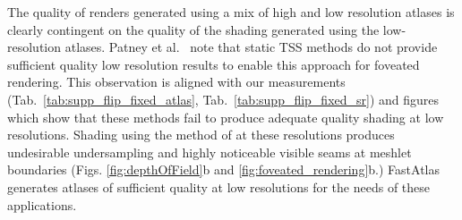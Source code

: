 The quality of renders generated using a mix of high and low resolution atlases is clearly contingent on the quality of the shading generated using the low-resolution atlases. Patney et al.~ note that static TSS methods do not provide sufficient quality low resolution results to enable this approach for foveated rendering.
This observation is aligned with our measurements (Tab.~\ref{tab:supp_flip_fixed_atlas}, Tab.~\ref{tab:supp_flip_fixed_sr}) and figures which show that these methods fail to produce adequate quality shading at low resolutions. Shading using the method of \cite{Neff2022MSA} at these resolutions produces undesirable undersampling and highly noticeable visible seams at meshlet boundaries (Figs. \ref{fig:depthOfField}b and \ref{fig:foveated_rendering}b.)  FastAtlas generates atlases of sufficient quality at low resolutions for the needs of these applications.
